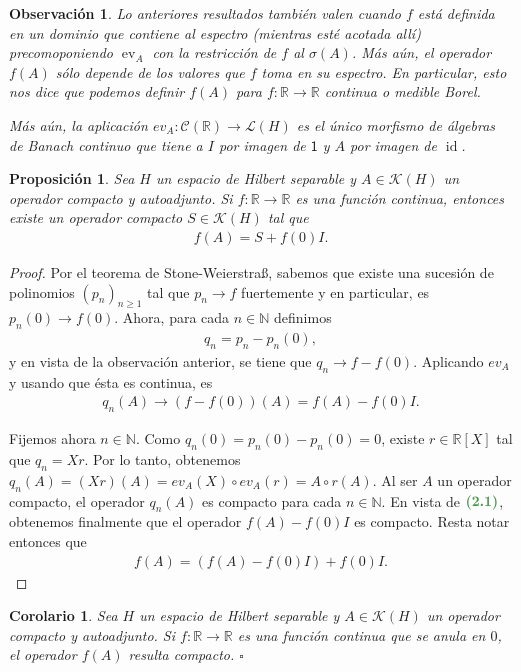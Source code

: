 \documentclass[11pt]{report}
\theoremstyle{colored}
\newtheorem{proposition}{Proposición}[section]
\newtheorem{corollary}{Corolario}[section]
\newtheorem{remark}{Observación}[section]
\newcommand{\N}{\mathbb{N}}
\newcommand{\R}{\mathbb{R}}
\newcommand{\ev}{\operatorname{ev}}
\newcommand{\id}{\operatorname{id}}
\newcommand{\paint}[1]{\color{color}{#1}}
\newcommand{\tpaint}[1]{\paint{\textbf{#1}}}
\begin{document}
\begin{remark} Lo anteriores resultados también valen cuando $f$ está definida en un dominio que contiene al espectro (mientras esté acotada allí) precomoponiendo $\ev_A$ con la restricción de $f$ al $\sigma(A)$. Más aún, el operador $f(A)$ sólo depende de los valores que $f$ toma en su espectro. En particular, esto nos dice que podemos definir $f(A)$ para $f : \R \to \R$ continua o medible Borel. 

Más aún, la aplicación $ev_A : \mathcal{C}(\R) \to \mathscr{L}(H)$ es el único morfismo de álgebras de Banach continuo que tiene a $I$ por imagen de $\mathsf{1}$ y $A$ por imagen de $\id$.
\end{remark}

\begin{proposition} Sea $H$ un espacio de Hilbert separable y $A \in \mathscr{K}(H)$ un operador compacto y autoadjunto. Si $f : \R \to \R$ es una función continua, entonces existe un operador compacto $S \in \mathscr{K}(H)$ tal que
\begin{align*}
f(A) = S + f(0)I.
\end{align*}
\end{proposition}
\begin{proof} Por el teorema de Stone-Weierstraß, sabemos que existe una sucesión de polinomios $(p_n)_{n \geq 1}$ tal que $p_n \to f$ fuertemente y en particular, es $p_n(0) \to f(0)$. Ahora, para cada $n \in \N$ definimos
\begin{align*}
q_n = p_n - p_n(0),
\end{align*} 
y en vista de la observación anterior, se tiene que $q_n \to f - f(0)$. Aplicando $ev_A$ y usando que ésta es continua, es
\begin{align}
q_n(A) \to (f-f(0))(A) = f(A) - f(0)I.
\end{align}

Fijemos ahora $n \in \N$. Como $q_n(0) = p_n(0) - p_n(0) = 0$, existe $r \in \R[X]$ tal que $q_n = Xr$. Por lo tanto, obtenemos $q_n(A) = (Xr)(A) = ev_A(X) \circ ev_A(r) = A \circ r(A)$. Al ser $A$ un operador compacto, el operador $q_n(A)$ es compacto para cada $n \in \N$. En vista de $\tpaint{(2.1)}$, obtenemos finalmente que el operador $f(A) - f(0)I$ es compacto. Resta notar entonces que
\begin{align*}
f(A) = (f(A)-f(0)I) + f(0)I.
\end{align*}  
\end{proof}

\begin{corollary} Sea $H$ un espacio de Hilbert separable y $A \in \mathscr{K}(H)$ un operador compacto y autoadjunto. Si $f : \R \to \R$ es una función continua que se anula en $0$, el operador $f(A)$ resulta compacto. $\square$
\end{corollary}
\end{document}
